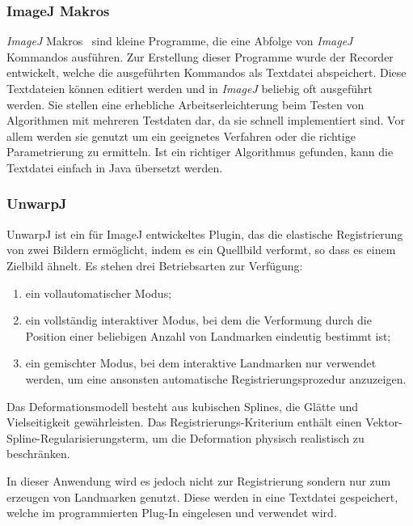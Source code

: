 \subsubsection{ImageJ Makros}	
\textit{ImageJ} Makros~\cite{JMacros} sind kleine Programme, die eine Abfolge von \textit{ImageJ} Kommandos ausführen. Zur Erstellung dieser Programme wurde der Recorder entwickelt, welche die ausgeführten Kommandos als Textdatei abspeichert. Diese Textdateien können editiert werden und in \textit{ImageJ} beliebig oft ausgeführt werden. Sie stellen eine erhebliche Arbeitserleichterung beim Testen von Algorithmen mit mehreren Testdaten dar, da sie schnell implementiert sind. Vor allem werden sie genutzt um ein geeignetes Verfahren oder die richtige Parametrierung zu ermitteln. Ist ein richtiger Algorithmus gefunden, kann die Textdatei einfach in Java übersetzt werden.



\subsubsection{UnwarpJ}

UnwarpJ ist ein für ImageJ entwickeltes Plugin, das die elastische Registrierung von zwei Bildern ermöglicht, indem es ein Quellbild verformt, so dass es einem Zielbild ähnelt. 
Es stehen drei Betriebsarten zur Verfügung: 

\begin{enumerate}
\item ein vollautomatischer Modus; 
\item ein vollständig interaktiver Modus, bei dem die Verformung durch die Position einer beliebigen Anzahl von Landmarken eindeutig bestimmt ist; 
\item ein gemischter Modus, bei dem interaktive Landmarken nur verwendet werden, um eine ansonsten automatische Registrierungsprozedur anzuzeigen.
\end{enumerate}

Das Deformationsmodell besteht aus kubischen Splines, die Glätte und Vielseitigkeit gewährleisten. Das Registrierungs-Kriterium enthält einen Vektor-Spline-Regularisierungsterm, um die Deformation physisch realistisch zu beschränken.\cite{unwrapj}

In dieser Anwendung wird es jedoch nicht zur Registrierung sondern nur zum erzeugen von Landmarken genutzt. Diese werden in eine Textdatei gespeichert, welche im programmierten Plug-In eingelesen und verwendet wird.


